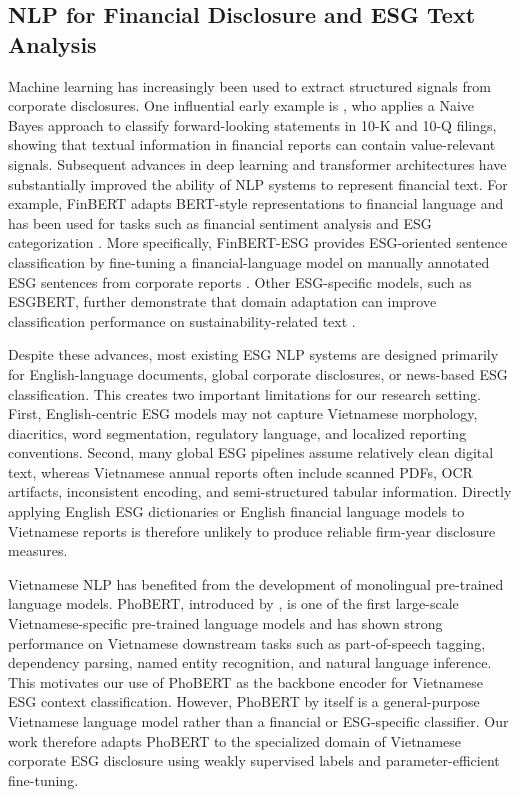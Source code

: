 \documentclass{article}
\theoremstyle{plain}
\theoremstyle{definition}
\theoremstyle{remark}
\begin{document}
\subsection{NLP for Financial Disclosure and ESG Text Analysis}

Machine learning has increasingly been used to extract structured signals from corporate disclosures. 
One influential early example is \citet{li2010information}, who applies a Naive Bayes approach to classify forward-looking statements in 10-K and 10-Q filings, showing that textual information in financial reports can contain value-relevant signals. 
Subsequent advances in deep learning and transformer architectures have substantially improved the ability of NLP systems to represent financial text. 
For example, FinBERT adapts BERT-style representations to financial language and has been used for tasks such as financial sentiment analysis and ESG categorization \citep{huang2022finbert}. 
More specifically, FinBERT-ESG provides ESG-oriented sentence classification by fine-tuning a financial-language model on manually annotated ESG sentences from corporate reports \citep{finbertesg}. 
Other ESG-specific models, such as ESGBERT, further demonstrate that domain adaptation can improve classification performance on sustainability-related text \citep{mehra2022esgbert}.

Despite these advances, most existing ESG NLP systems are designed primarily for English-language documents, global corporate disclosures, or news-based ESG classification. 
This creates two important limitations for our research setting. 
First, English-centric ESG models may not capture Vietnamese morphology, diacritics, word segmentation, regulatory language, and localized reporting conventions. 
Second, many global ESG pipelines assume relatively clean digital text, whereas Vietnamese annual reports often include scanned PDFs, OCR artifacts, inconsistent encoding, and semi-structured tabular information. 
Directly applying English ESG dictionaries or English financial language models to Vietnamese reports is therefore unlikely to produce reliable firm-year disclosure measures.

Vietnamese NLP has benefited from the development of monolingual pre-trained language models. 
PhoBERT, introduced by \citet{nguyen2020phobert}, is one of the first large-scale Vietnamese-specific pre-trained language models and has shown strong performance on Vietnamese downstream tasks such as part-of-speech tagging, dependency parsing, named entity recognition, and natural language inference. 
This motivates our use of PhoBERT as the backbone encoder for Vietnamese ESG context classification. 
However, PhoBERT by itself is a general-purpose Vietnamese language model rather than a financial or ESG-specific classifier. 
Our work therefore adapts PhoBERT to the specialized domain of Vietnamese corporate ESG disclosure using weakly supervised labels and parameter-efficient fine-tuning.
\end{document}
